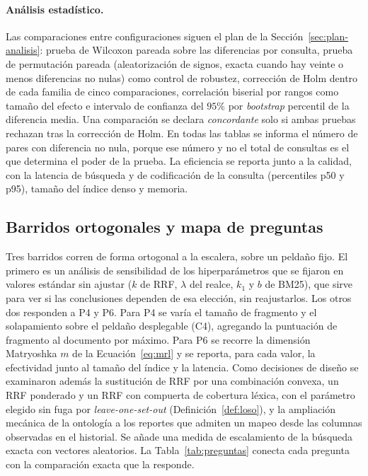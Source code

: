 \documentclass[11pt,letterpaper]{article}
\numberwithin{equation}{section}
\begin{document}
\paragraph{Análisis estadístico.} Las comparaciones entre configuraciones siguen el plan de la Sección~\ref{sec:plan-analisis}: prueba de Wilcoxon pareada sobre las diferencias por consulta, prueba de permutación pareada (aleatorización de signos, exacta cuando hay veinte o menos diferencias no nulas) como control de robustez, corrección de Holm dentro de cada familia de cinco comparaciones, correlación biserial por rangos como tamaño del efecto e intervalo de confianza del $95\%$ por \textit{bootstrap} percentil de la diferencia media. Una comparación se declara \emph{concordante} solo si ambas pruebas rechazan tras la corrección de Holm. En todas las tablas se informa el número de pares con diferencia no nula, porque ese número y no el total de consultas es el que determina el poder de la prueba. La eficiencia se reporta junto a la calidad, con la latencia de búsqueda y de codificación de la consulta (percentiles p50 y p95), tamaño del índice denso y memoria.

\subsection{Barridos ortogonales y mapa de preguntas}
Tres barridos corren de forma ortogonal a la escalera, sobre un peldaño fijo. El primero es un análisis de sensibilidad de los hiperparámetros que se fijaron en valores estándar sin ajustar ($k$ de RRF, $\lambda$ del realce, $k_1$ y $b$ de BM25), que sirve para ver si las conclusiones dependen de esa elección, sin reajustarlos. Los otros dos responden a P4 y P6. Para P4 se varía el tamaño de fragmento y el solapamiento sobre el peldaño desplegable (C4), agregando la puntuación de fragmento al documento por máximo. Para P6 se recorre la dimensión Matryoshka $m$ de la Ecuación~\eqref{eq:mrl} y se reporta, para cada valor, la efectividad junto al tamaño del índice y la latencia. Como decisiones de diseño se examinaron además la sustitución de RRF por una combinación convexa, un RRF ponderado y un RRF con compuerta de cobertura léxica, con el parámetro elegido sin fuga por \textit{leave-one-set-out} (Definición~\ref{def:loso}), y la ampliación mecánica de la ontología a los reportes que admiten un mapeo desde las columnas observadas en el historial. Se añade una medida de escalamiento de la búsqueda exacta con vectores aleatorios. La Tabla~\ref{tab:preguntas} conecta cada pregunta con la comparación exacta que la responde.
\end{document}
